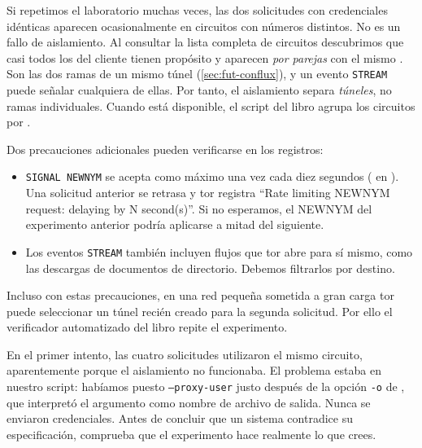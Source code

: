 \begin{approfondimento}
Si repetimos el laboratorio muchas veces, las dos solicitudes con credenciales idénticas aparecen ocasionalmente en circuitos con números distintos. No es un fallo de aislamiento. Al consultar la lista completa de circuitos descubrimos que casi todos los del cliente tienen propósito  y aparecen \emph{por parejas} con el mismo . Son las dos ramas de un mismo túnel (\cref{sec:fut-conflux}), y un evento \texttt{STREAM} puede señalar cualquiera de ellas. Por tanto, el aislamiento separa \emph{túneles}, no ramas individuales. Cuando está disponible, el script del libro agrupa los circuitos por .

Dos precauciones adicionales pueden verificarse en los registros:
\begin{itemize}
  \item \texttt{SIGNAL NEWNYM} se acepta como máximo una vez cada diez segundos ( en ). Una solicitud anterior se retrasa y tor registra \enquote{Rate limiting NEWNYM request: delaying by N second(s)}. Si no esperamos, el NEWNYM del experimento anterior podría aplicarse a mitad del siguiente.
  \item Los eventos \texttt{STREAM} también incluyen flujos que tor abre para sí mismo, como las descargas de documentos de directorio. Debemos filtrarlos por destino.
\end{itemize}

Incluso con estas precauciones, en una red pequeña sometida a gran carga tor puede seleccionar un túnel recién creado para la segunda solicitud. Por ello el verificador automatizado del libro repite el experimento.
\end{approfondimento}

\begin{attenzione}
En el primer intento, las cuatro solicitudes utilizaron el mismo circuito, aparentemente porque el aislamiento no funcionaba. El problema estaba en nuestro script: habíamos puesto \texttt{--proxy-user} justo después de la opción \texttt{-o} de , que interpretó el argumento como nombre de archivo de salida. Nunca se enviaron credenciales. Antes de concluir que un sistema contradice su especificación, comprueba que el experimento hace realmente lo que crees.
\end{attenzione}

